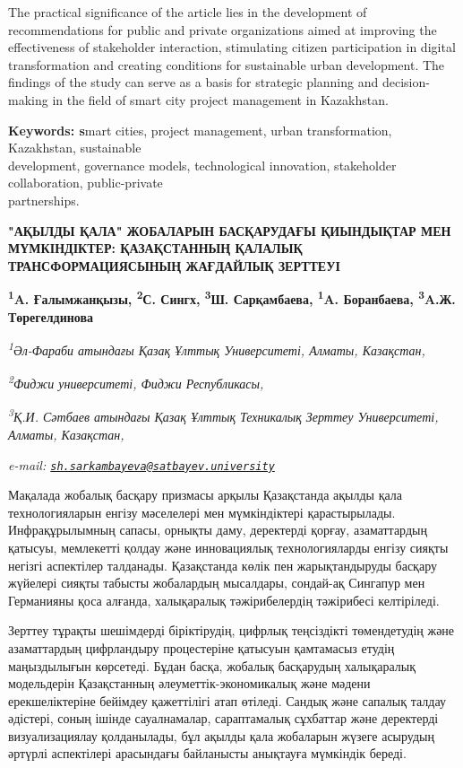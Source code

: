The practical significance of the article lies in the development of
recommendations for public and private organizations aimed at improving
the effectiveness of stakeholder interaction, stimulating citizen
participation in digital transformation and creating conditions for
sustainable urban development. The findings of the study can serve as a
basis for strategic planning and decision-making in the field of smart
city project management in Kazakhstan.

{\bfseries Keywords: s}mart cities, project management, urban
transformation, Kazakhstan, sustainable \\development, governance models,
technological innovation, stakeholder collaboration, public-private\\
partnerships.

\begin{articleheader}
{\bfseries "АҚЫЛДЫ ҚАЛА" ЖОБАЛАРЫН БАСҚАРУДАҒЫ ҚИЫНДЫҚТАР МЕН МҮМКІНДІКТЕР: ҚАЗАҚСТАННЫҢ ҚАЛАЛЫҚ ТРАНСФОРМАЦИЯСЫНЫҢ ЖАҒДАЙЛЫҚ ЗЕРТТЕУІ}

{\bfseries
\textsuperscript{1}A. Ғалымжанқызы,
\textsuperscript{2}С. Сингх,
\textsuperscript{3}Ш. Сарқамбаева\textsuperscript{\envelope },
\textsuperscript{1}A. Боранбаева,
\textsuperscript{3}A.Ж. Төрегелдинова}
\end{articleheader}

\begin{affiliation}
\emph{\textsuperscript{1}Әл-Фараби атындағы Қазақ Ұлттық Университеті, Алматы, Казақстан,}

\emph{\textsuperscript{2}Фиджи университеті, Фиджи Республикасы,}

\emph{\textsuperscript{3}Қ.И. Сәтбаев атындағы Қазақ Ұлттық Техникалық Зерттеу Университеті, Алматы, Казақстан,}

\emph{e-mail: \href{mailto:sh.sarkambayeva@satbayev.university}{\nolinkurl{sh.sarkambayeva@satbayev.university}}}
\end{affiliation}

Мақалада жобалық басқару призмасы арқылы Қазақстанда ақылды қала
технологияларын енгізу мәселелері мен мүмкіндіктері қарастырылады.
Инфрақұрылымның сапасы, орнықты даму, деректерді қорғау, азаматтардың
қатысуы, мемлекетті қолдау және инновациялық технологияларды енгізу
сияқты негізгі аспектілер талданады. Қазақстанда көлік пен
жарықтандыруды басқару жүйелері сияқты табысты жобалардың мысалдары,
сондай-ақ Сингапур мен Германияны қоса алғанда, халықаралық
тәжірибелердің тәжірибесі келтіріледі.

Зерттеу тұрақты шешімдерді біріктірудің, цифрлық теңсіздікті
төмендетудің және азаматтардың цифрландыру процестеріне қатысуын
қамтамасыз етудің маңыздылығын көрсетеді. Бұдан басқа, жобалық
басқарудың халықаралық модельдерін Қазақстанның әлеуметтік-экономикалық
және мәдени ерекшеліктеріне бейімдеу қажеттілігі атап өтіледі. Сандық
және сапалық талдау әдістері, соның ішінде сауалнамалар, сараптамалық
сұхбаттар және деректерді визуализациялау қолданылады, бұл ақылды қала
жобаларын жүзеге асырудың әртүрлі аспектілері арасындағы байланысты
анықтауға мүмкіндік береді.


